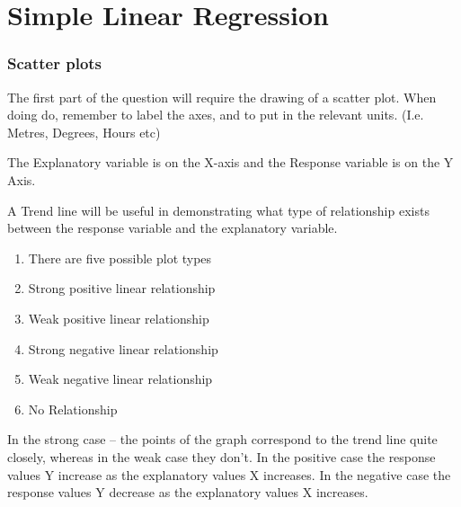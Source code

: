 \documentclass{beamer}
\begin{document}
\section{Simple Linear Regression}

\begin{frame}
\frametitle{Scatter plots}

The first part of the question will require the drawing of a scatter plot. 
When doing do, remember to label the axes, and to put in the relevant units. (I.e. Metres, Degrees, Hours etc)

The Explanatory variable is on the X-axis and the Response variable is on the Y Axis.

A Trend line will be useful in demonstrating what type of relationship exists between the response variable and the explanatory variable.
\end{frame}
\begin{frame}
\begin{enumerate}
\item There are five possible plot types
\item Strong positive linear relationship 
\item Weak positive linear relationship
\item Strong negative linear relationship
\item Weak negative linear relationship
\item No Relationship
\end{enumerate}
In the strong case – the points of the graph correspond to the trend line quite closely, whereas in the weak case they don’t.
In the positive case the response values Y increase as the explanatory values X increases. In the negative case the response values Y decrease as the explanatory values X increases. 

\end{frame}
\end{document}
